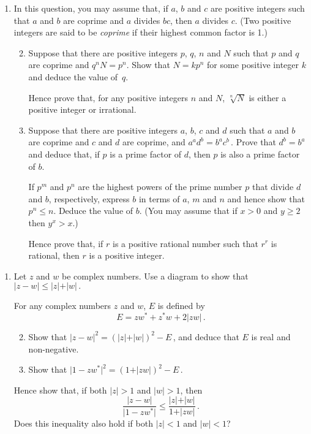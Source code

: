 \documentclass[a4, 11pt]{report}
\newlength{\qspace}
\newcounter{qnumber}
\newenvironment{question}%
 {\vspace{\qspace}
  \begin{enumerate}[\bfseries 1\quad][10]%
    \setcounter{enumi}{\value{qnumber}}%
    \item%
 }
{
  \end{enumerate}
  \filbreak
  \stepcounter{qnumber}
 }
\newenvironment{questionparts}[1][1]%
 {
  \begin{enumerate}[\bfseries (i)]%
    \setcounter{enumii}{#1}
    \addtocounter{enumii}{-1}
    \setlength{\itemsep}{5mm}
    \setlength{\parskip}{8pt}
 }
 {
  \end{enumerate}
 }
\def\le{\leqslant}
\def\ge{\geqslant}
\begin{document}
\begin{question}
In this question, you may assume that, if $a$, $b$ and $c$ are positive integers
such that $a$ and $b$ are coprime
and $a$ divides $bc$, then $a$ divides $c$. (Two positive integers are
said to be {\em coprime} if their highest common factor is 1.)

\begin{questionparts}
\item
Suppose that there are positive integers $p$, $q$, $n$ and $N$ such that $p$ and $q$
are coprime and  $q^nN=p^n$. Show that $N=kp^n$ for some positive integer $k$
and deduce the value of~$q$.

Hence prove that, for any positive integers $n$ and $N$, $\sqrt[n]N$
 is either a positive integer or irrational.

\item
Suppose that there are positive integers $a$, $b$, $c$ and $d$ such that 
$a$ and $b$ are coprime and $c$ and $d$ are coprime,
and $a^ad^b = b^a c^b \,$.
Prove that $d^b = b^a$ and deduce that, if $p$ is a prime factor of $d$, then
$p$ is also a prime factor of $b$.

If $p^m$ and $p^n$ are the highest powers of  the prime number $p$ that divide 
$d$ and $b$, respectively, express $b$ in terms of $a$, $m$ and $n$ and hence show that
$p^n\le n$. Deduce the value of $b$. (You may assume that
if $x>0$ and $y\ge2$ then 
 $y^x>x$.)

Hence prove that, 
if $r$ is a positive rational number such that $r^r$ is rational, then
$r$ is a positive integer.

\end{questionparts}
\end{question}
	
\begin{question}
Let $z$ and $w$ be complex numbers. Use a diagram to show that
 $\vert z-w \vert \le \vert z\vert + \vert w \vert\,.$

For any complex numbers $z$ and $w$,  $E$ is defined by 
\[
E = zw^* + z^*w +2 \vert zw \vert\,.
\]

\begin{questionparts}
\item
Show that 
 $\vert z-w\vert^2 = \left( \vert z \vert + \vert w\vert\right)^2 -E\,$,
and deduce that $E$ is real and non-negative.

\item Show that 
 $\vert 1-zw^*\vert^2 = \left ( 1 +\vert zw \vert \right)^2 -E\,$.
\end{questionparts}

Hence show  that, if both $\vert z \vert >1$ and $\vert w \vert >1$, then
\[
 \frac {\vert z-w\vert} {\vert 1-zw^*\vert } 
\le \frac{\vert z \vert   +\vert w\vert  }{1+\vert z  w \vert}\,.
\]
Does this inequality also hold if  both $\vert z \vert <1$ and 
$\vert w \vert <1$?
\end{question}
	
\end{document}
